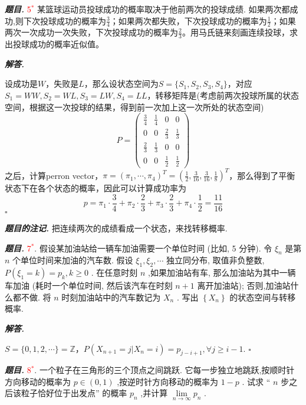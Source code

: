 \documentclass[10pt, a4paper, oneside]{ctexart}
\newenvironment{problem}{\begin{framed}\par\noindent\textbf{\textit{题目. }}}{\end{framed}\par}
\newenvironment{solution}{%
  \par\noindent\textbf{\textit{解答. }}\ignorespaces
}{%
  \hfill\ensuremath{\square}\par %
}
\newenvironment{note}{\par\noindent\textbf{\textit{题目的注记. }}\ignorespaces}{\par}
\begin{document}
\begin{problem}
\textcolor{red}{5$^*$} 某篮球运动员投球成功的概率取决于他前两次的投球成绩. 如果两次都成功,则下次投球成功的概率为$\frac{3}{4}$；如果两次都失败，下次投球成功的概率为$\frac{1}{2}$；如果两次一次成功一次失败，下次投球成功的概率为$\frac{2}{3}$。用马氏链来刻画连续投球，求出投球成功的概率近似值。
\end{problem}
\begin{solution}
设成功是$W$，失败是$L$，那么设状态空间为$S=\{S_1,S_2,S_3,S_4\}$，对应$S_1=WW,S_2=WL,S_3=LW,S_4=LL$，转移矩阵是(考虑前两次投球所属的状态空间，根据这一次投球的结果，得到前一次加上这一次所处的状态空间)
    $$P=\begin{pmatrix}
        \frac{3}{4}&\frac{1}{4}&0&0\\0&0&\frac{2}{3}&\frac{1}{3}\\ \frac{2}{3}&\frac{1}{3}&0&0\\ 0&0&\frac{1}{2}&\frac{1}{2}
    \end{pmatrix}$$
    之后，计算perron vector，$\pi=(\pi_1,\cdots,\pi_4)^T=(\frac{1}{2},\frac{3}{16},\frac{3}{16},\frac{1}{8})^T$，那么得到了平衡状态下在各个状态的概率，因此可以计算成功率为
    $$p=\pi_1\cdot \frac{3}{4}+\pi_2\cdot \frac{2}{3}+\pi_3\cdot \frac{2}{3}+\pi_4\cdot \frac{1}{2}=\frac{11}{16}$$
\end{solution}
\begin{note}
把连续两次的成绩看成一个状态，来找转移概率.
\end{note}


\begin{problem}
\textcolor{red}{7$^*$}. 假设某加油站给一辆车加油需要一个单位时间 (比如, 5 分钟). 令 \( {\xi }_{n} \) 是第 \( n \) 个单位时间来加油的汽车数. 假设 \( {\xi }_{1},{\xi }_{2},\cdots \) 独立同分布, 取值非负整数, \( P\left( {{\xi }_{1} = k}\right) = {p}_{k},k \geq 0 \) . 在任意时刻 \( n \) ,如果加油站有车, 那么加油站为其中一辆车加油 (耗时一个单位时间, 然后该汽车在时刻 \( n + 1 \) 离开加油站); 否则,加油站什么都不做. 将 \( n \) 时刻加油站中的汽车数记为 \( {X}_{n} \) . 写出 \( \left\{ {X}_{n}\right\} \) 的状态空间与转移概率.
\end{problem}
\begin{solution}
$S=\{0,1,2,\cdots\}=\mathbb{Z}$，$P(X_{n+1}=j|X_n=i)=p_{j-i+1}, \forall j\geq i-1$.
\end{solution}

\begin{problem}
    \textcolor{red}{8$^*$}. 一个粒子在三角形的三个顶点之间跳跃. 它每一步独立地跳跃,按顺时针方向移动的概率为 \( p \in \left( {0,1}\right) \) ,按逆时针方向移动的概率为 \( 1 - p \) . 试求 “ \( n \) 步之后该粒子恰好位于出发点” 的概率 \( {p}_{n} \) ,并计算 \( \mathop{\lim }\limits_{{n \rightarrow \infty }}{p}_{n} \) .
\end{problem}
\end{document}
